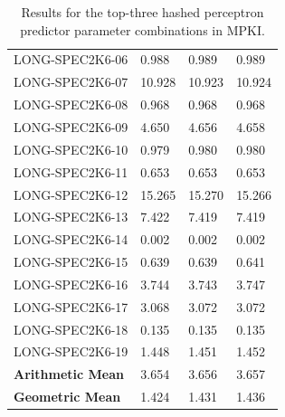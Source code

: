 \documentclass{article}
\begin{document}
\begin{table}[h]
\begin{tabular}{llll}
        LONG-SPEC2K6-06  & 0.988 & 0.989 & 0.989 \\
        LONG-SPEC2K6-07  & 10.928 & 10.923 & 10.924 \\
        LONG-SPEC2K6-08  & 0.968 & 0.968 & 0.968 \\
        LONG-SPEC2K6-09  & 4.650 & 4.656 & 4.658 \\
        LONG-SPEC2K6-10  & 0.979 & 0.980 & 0.980 \\
        LONG-SPEC2K6-11  & 0.653 & 0.653 & 0.653 \\
        LONG-SPEC2K6-12  & 15.265 & 15.270 & 15.266 \\
        LONG-SPEC2K6-13  & 7.422 & 7.419 & 7.419 \\
        LONG-SPEC2K6-14  & 0.002 & 0.002 & 0.002 \\
        LONG-SPEC2K6-15  & 0.639 & 0.639 & 0.641 \\
        LONG-SPEC2K6-16  & 3.744 & 3.743 & 3.747 \\
        LONG-SPEC2K6-17  & 3.068 & 3.072 & 3.072 \\
        LONG-SPEC2K6-18  & 0.135 & 0.135 & 0.135 \\
        LONG-SPEC2K6-19  & 1.448 & 1.451 & 1.452 \\
        \midrule
        \textbf{Arithmetic Mean} & 3.654 & 3.656 & 3.657 \\
        \textbf{Geometric Mean} & 1.424 & 1.431 & 1.436 \\
        \bottomrule
    \end{tabular}
    \caption{Results for the top-three hashed perceptron predictor parameter combinations in MPKI.}
    \label{tab:hp_res}
\end{table}
\end{document}

